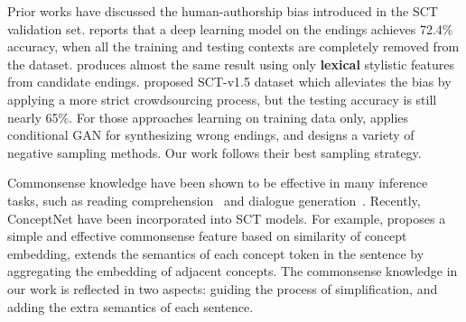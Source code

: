 Prior works have discussed the human-authorship bias
introduced in the SCT validation set.
 reports that a deep learning model on the endings
achieves 72.4\% accuracy, when all the training and testing contexts
are completely removed from the dataset.
 produces almost the same result using only
\textbf{lexical} stylistic features from candidate endings.
 proposed SCT-v1.5 dataset which alleviates
the bias by applying a more strict crowdsourcing process,
but the testing accuracy is still nearly 65\%.
For those approaches learning on training data only,
 applies conditional GAN for
synthesizing wrong endings,
and 
designs a variety of negative sampling methods.
Our work follows their best sampling strategy.


Commonsense knowledge have been shown to be effective in many
inference tasks,
such as reading comprehension~\cite{mihaylov2018knowledgeable}
and dialogue generation~\cite{liu2018knowledge}.
Recently, ConceptNet have been incorporated into SCT models.
For example,  proposes a simple and
effective commonsense feature based on similarity of concept embedding,
 extends the semantics of each concept token
in the sentence by aggregating the embedding of adjacent concepts.
The commonsense knowledge in our work is reflected in two aspects:
guiding the process of simplification,
and adding the extra semantics of each sentence.


